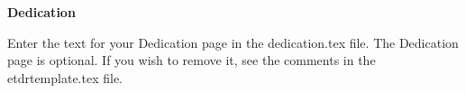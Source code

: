 
\newpage
\vspace*{0.9cm}
\begin{center}
{\bf \Huge Dedication}
\end{center}

\setlength{\baselineskip}{0.8cm}



Enter the text for your Dedication page in the dedication.tex file.  The Dedication page is optional.  If you wish to remove it, see the comments in the etdrtemplate.tex file.
